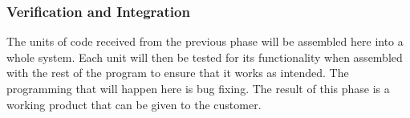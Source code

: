 \subsubsection{Verification and Integration}

The units of code received from the previous phase will be assembled here into a whole 
system. Each unit will then be tested for its functionality when assembled with the rest of 
the program to ensure that it works as intended. The programming 
that will happen here is bug fixing. The result of this phase is a 
working product that can be given to the customer\cite{waterfallexplained}.